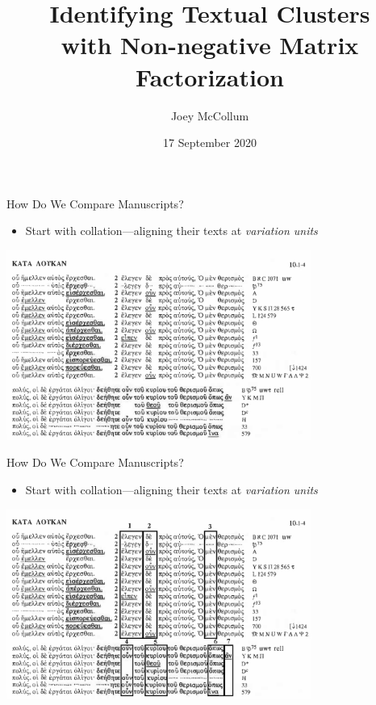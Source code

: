 \documentclass[10pt]{beamer}
\title{Identifying Textual Clusters\\with Non-negative Matrix Factorization}
\author{Joey McCollum\inst{*}}
\institute{\inst{*}Virginia Polytechnic Institute and State University}
\date{17 September 2020}
\begin{document}
	\begin{frame}
		\titlepage
	\end{frame}
	\begin{frame}{How Do We Compare Manuscripts?}
		\begin{itemize}
			\item Start with collation—aligning their texts at \emph{variation units}
		\end{itemize}
		\begin{center}
			\includegraphics[width=0.75\textwidth]{../graphics/swanson_scan_luke_10_2.png}
		\end{center}
		\footnotesize\parencite[Source:][183]{Swanson.Luke}
	\end{frame}
	\begin{frame}{How Do We Compare Manuscripts?}
		\begin{itemize}
			\item Start with collation—aligning their texts at \emph{variation units}
		\end{itemize}
		\begin{center}
			\includegraphics[width=0.75\textwidth]{../graphics/swanson_scan_luke_10_2_variation_units.png}
		\end{center}
		\phantom{\footnotesize\parencite[Source:][183]{Swanson.Luke}}
	\end{frame}
\end{document}
